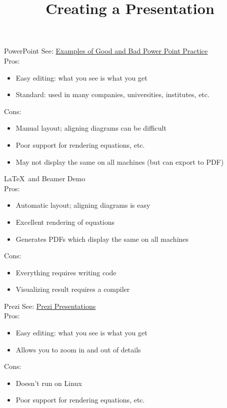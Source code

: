 \documentclass{beamer}
\title{Creating a Presentation}
\date{}
\begin{document}
\begin{frame}
\titlepage
\end{frame}

\begin{frame}{PowerPoint}
See: \href{http://www.feg-consulting.com/resource/practitioners-guide-to-hea/annexes-practitioners-guide/chapter-5/annex-d/}{Examples of Good and Bad Power Point Practice}\\
\bigskip
Pros:
\begin{itemize}
\item Easy editing: what you see is what you get
\item Standard: used in many companies, universities, institutes, etc.
\end{itemize}
Cons:
\begin{itemize}
\item Manual layout; aligning diagrams can be difficult
\item Poor support for rendering equations, etc.
\item May not display the same on all machines (but can export to PDF)
\end{itemize}
\end{frame}

\begin{frame}{\LaTeX\ and Beamer}
Demo\\
\bigskip
Pros:
\begin{itemize}
\item Automatic layout; aligning diagrams is easy
\item Excellent rendering of equations
\item Generates PDFs which display the same on all machines
\end{itemize}
Cons:
\begin{itemize}
\item Everything requires writing code
\item Visualizing result requires a compiler
\end{itemize}
\end{frame}

\begin{frame}{Prezi}
See: \href{http://prezi.com/c9pdlrpx3pr6/copy-of-presentation-on-presentations/}{Prezi Presentations}\\
\bigskip
Pros:
\begin{itemize}
\item Easy editing: what you see is what you get
\item Allows you to zoom in and out of details
\end{itemize}
Cons:
\begin{itemize}
\item Doesn't run on Linux
\item Poor support for rendering equations, etc.
\end{itemize}
\end{frame}
\end{document}
